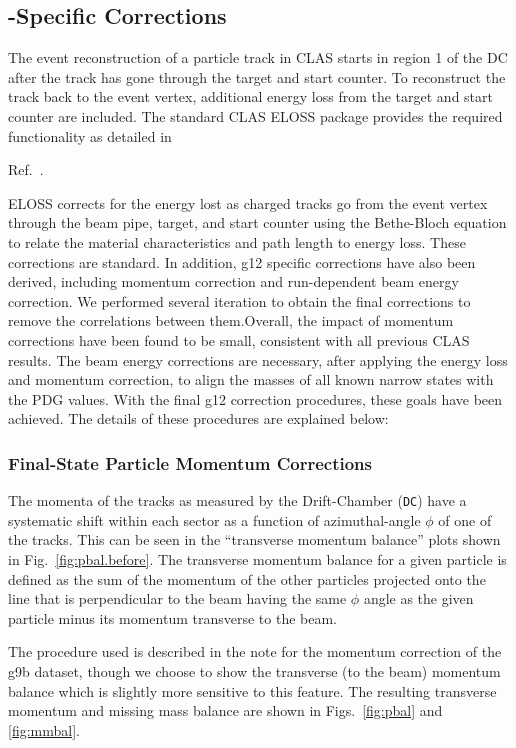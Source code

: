 \subsection{\label{sec:corrections}-Specific Corrections}
The event reconstruction of a particle track in CLAS starts in region 1 of the DC after the track has gone through the target and start counter. To reconstruct the track back to the event vertex, additional energy loss from the target and start counter are included. The standard CLAS ELOSS package provides the required functionality as detailed in \begin{v2}Ref.~\cite{clas.note.eloss}.\end{v2} ELOSS corrects for the energy lost as charged tracks go from the event vertex through the beam pipe, target, and start counter using the Bethe-Bloch equation \cite{pdg} to relate the material characteristics and path length to energy loss. These corrections are standard. In addition, g12 specific corrections have also been derived, including momentum correction and run-dependent beam energy correction. We performed several iteration to obtain the final corrections to remove the correlations between them.Overall, the impact of momentum corrections have been found to be small, consistent with all previous CLAS results. The beam energy corrections are necessary, after applying the energy loss and momentum correction, to align the masses of all known narrow states with the PDG values. With the final g12 correction procedures, these goals have been achieved. The details of these procedures are explained below:

\subsubsection{\label{sec:corrections.pcor}Final-State Particle Momentum Corrections}


The momenta of the tracks as measured by the Drift-Chamber (\texttt{DC}) have a systematic shift within each sector as a function of azimuthal-angle $\phi$ of one of the tracks. This can be seen in the ``transverse momentum balance'' plots shown in Fig.~\ref{fig:pbal.before}. The transverse momentum balance for a given particle is defined as the sum of the momentum of the other particles projected onto the line that is perpendicular to the beam having the same $\phi$ angle as the given particle minus its momentum transverse to the beam.

The procedure used is described in the  note for the momentum correction of the g9b dataset\cite{clas.note.g9bpcor}, though we choose to show the transverse (to the beam) momentum balance which is slightly more sensitive to this feature. The resulting transverse momentum and missing mass balance are shown in Figs.~\ref{fig:pbal} and \ref{fig:mmbal}.

